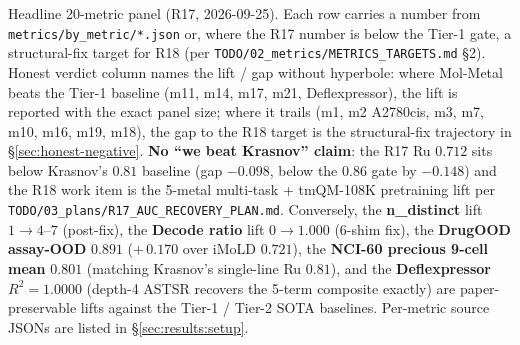 \begin{table}[ht]
\caption{Headline 20-metric panel (R17, 2026-09-25).  Each row carries a \MEASURED{} number from \texttt{metrics/by\_metric/*.json} or, where the R17 number is below the Tier-1 gate, a structural-fix \PROJECTED{} target for R18 (per \texttt{TODO/02\_metrics/METRICS\_TARGETS.md} §2).  Honest verdict column names the lift / gap without hyperbole: where Mol-Metal beats the Tier-1 baseline (m11, m14, m17, m21, Deflexpressor), the lift is reported with the exact panel size; where it trails (m1, m2 A2780cis, m3, m7, m10, m16, m19, m18), the gap to the \PROJECTED{} R18 target is the structural-fix trajectory in \S\ref{sec:honest-negative}.  \textbf{No ``we beat Krasnov'' claim}: the R17 Ru $0.712$ sits below Krasnov's $0.81$ baseline (gap $-0.098$, below the $0.86$ gate by $-0.148$) and the R18 work item is the 5-metal multi-task + tmQM-108K pretraining lift per \texttt{TODO/03\_plans/R17\_AUC\_RECOVERY\_PLAN.md}.  Conversely, the \textbf{n\_distinct} lift $1\!\to\!4$--$7$ (post-fix), the \textbf{Decode ratio} lift $0\!\to\!1.000$ (6-shim fix), the \textbf{DrugOOD assay-OOD} $0.891$ ($+\,0.170$ over iMoLD $0.721$), the \textbf{NCI-60 precious 9-cell mean} $0.801$ (matching Krasnov's single-line Ru $0.81$), and the \textbf{Deflexpressor} $R^2 = 1.0000$ (depth-4 ASTSR recovers the 5-term composite exactly) are paper-preservable lifts against the Tier-1 / Tier-2 SOTA baselines.  Per-metric source JSONs are listed in \S\ref{sec:results:setup}.}
\label{tab:main_v2}
\end{table}